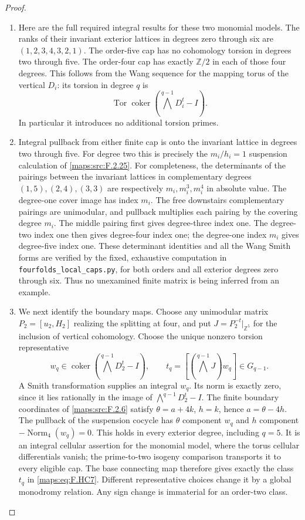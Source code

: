 \documentclass[11pt,a4paper]{article}
\theoremstyle{definition}
\begin{document}
\begin{proof}
\begin{enumerate}[label=\arabic*.]
\item Here are the full required integral results for these
two monomial models.
The ranks of their invariant exterior lattices in
degrees zero through six are
$(1,2,3,4,3,2,1)$.
The order-five cap has no cohomology torsion in degrees
two through five.
The order-four cap has exactly $\mathbb Z/2$ in each
of those four degrees.
This follows from the Wang sequence for the mapping
torus of the vertical $D_i$:
its torsion in degree $q$ is
\[
 \operatorname{Tor}\operatorname{coker}
       (\bigwedge^{q-1}D_i^t-I).
 \tag{F.HC6}\label{maps:eq:F.HC6}
\]
In particular it introduces no additional torsion primes.

\item Integral pullback from either finite cap is onto the
invariant lattice in degrees two through five.
For degree two this is precisely the $m_i/h_i=1$
suspension calculation of \ref{maps:src:F.2.25}.
For completeness, the determinants of the pairings between
the invariant lattices in complementary degrees
$(1,5),(2,4),(3,3)$ are respectively
$m_i,m_i^3,m_i^4$ in absolute value.
The degree-one cover image has index $m_i$.
The free downstairs complementary pairings are unimodular,
and pullback multiplies each pairing by the covering
degree $m_i$.
The middle pairing first gives degree-three index one.
The degree-two index one then gives degree-four index one;
the degree-one index $m_i$ gives degree-five index one.
These determinant identities and all the Wang Smith
forms are verified by the fixed, exhaustive computation
in \texttt{fourfolds\_local\_caps.py}, for both orders and
all exterior degrees zero through six.
Thus no unexamined finite matrix is being inferred from
an example.

\item We next identify the boundary maps.
Choose any unimodular matrix $P_2=[u_2,H_2]$ realizing
the splitting at four, and put
$J=P_2^{-t}|_{\mathbb Z^5}$ for the inclusion of vertical
cohomology.
Choose the unique nonzero torsion representative
\[
 w_q\in\operatorname{coker}
            (\bigwedge^{q-1}D_2^t-I),\qquad
 t_q=[(\bigwedge^{q-1}J)w_q]\in G_{q-1}.
 \tag{F.HC7}\label{maps:eq:F.HC7}
\]
A Smith transformation supplies an integral $w_q$.
Its norm is exactly zero, since it lies rationally in
the image of $\bigwedge^{q-1}D_2^t-I$.
The finite boundary coordinates of \ref{maps:src:F.2.6} satisfy
$\theta=a+4k$, $h=k$, hence $a=\theta-4h$.
The pullback of the suspension cocycle has $\theta$
component $w_q$ and $h$ component
$-\operatorname{Norm}_4(w_q)=0$.
This holds in every exterior degree, including $q=5$.
It is an integral cellular assertion for the monomial
model, where the torus cellular differentials vanish;
the prime-to-two isogeny comparison transports it to
every eligible cap.
The base connecting map therefore gives exactly the
class $t_q$ in \eqref{maps:eq:F.HC7}.
Different representative choices change it by a global
monodromy relation.  Any sign change is immaterial for
an order-two class.


\end{enumerate}
\end{proof}
\end{document}
